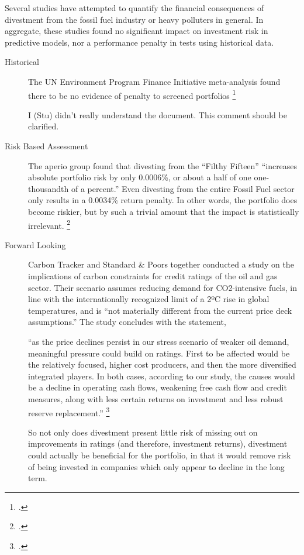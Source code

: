 Several studies have attempted to quantify the financial consequences of divestment from the fossil fuel industry or heavy polluters in general.
In aggregate, these studies found no significant impact on investment risk in predictive models, nor a performance penalty in tests using historical data.
\begin{description}
  \item[Historical] The UN Environment Program Finance Initiative meta-analysis found there to be no evidence of penalty to screened portfolios \footcite{UNEPFI2007}
  \begin{vcom}
    I (Stu) didn't really understand the document. This comment should be clarified.
  \end{vcom}
  \item[Risk Based Assessment] The aperio group found that divesting from the ``Filthy Fifteen'' ``increases absolute portfolio risk by only 0.0006\%, or about a half of one one-thousandth of a percent.'' Even divesting from the entire Fossil Fuel sector only results in a 0.0034\% return penalty. In other words, the portfolio does become riskier, but by such a trivial amount that the impact is statistically irrelevant. \footcite{Aperio2013}
  \item[Forward Looking] Carbon Tracker and Standard & Poors together conducted a study on the implications of carbon constraints for credit ratings of the oil and gas sector. Their scenario assumes reducing demand for CO2-intensive fuels, in line with the internationally recognized limit of a 2ºC rise in global temperatures, and is ``not materially different from the current price deck assumptions.'' The study concludes with the statement,
  \begin{slquote} ``as the price declines persist in our stress scenario of weaker oil demand, meaningful pressure could build on ratings. First to be affected would be the relatively focused, higher cost producers, and then the more diversified integrated players. In both cases, according to our study, the causes would be a decline in operating cash flows, weakening free cash flow and credit measures, along with less certain returns on investment and less robust reserve replacement.'' \footcite{SandPConstrained}
  \end{slquote}
  So not only does divestment present little risk of missing out on improvements in ratings (and therefore, investment returns), divestment could actually be beneficial for the portfolio, in that it would remove risk of being invested in companies which only appear to decline in the long term.
  
\end{description}


